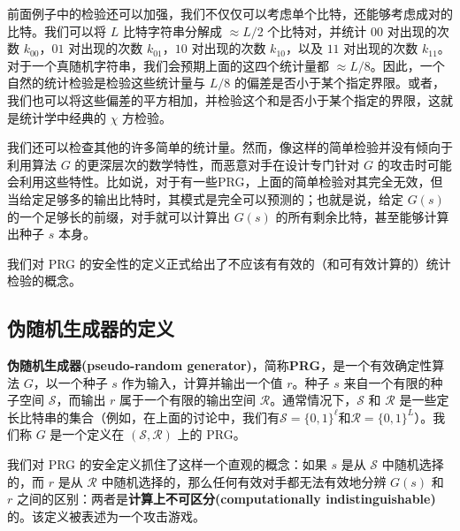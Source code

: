 前面例子中的检验还可以加强，我们不仅仅可以考虑单个比特，还能够考虑成对的比特。我们可以将 $L$ 比特字符串分解成 $\approx{L}/{2}$ 个比特对，并统计 $00$ 对出现的次数 $k_{00}$，$01$ 对出现的次数 $k_{01}$，$10$ 对出现的次数 $k_{10}$，以及 $11$ 对出现的次数 $k_{11}$。对于一个真随机字符串，我们会预期上面的这四个统计量都 $\approx{L}/{8}$。因此，一个自然的统计检验是检验这些统计量与 ${L}/{8}$ 的偏差是否小于某个指定界限。或者，我们也可以将这些偏差的平方相加，并检验这个和是否小于某个指定的界限，这就是统计学中经典的 $\chi$ 方检验。

我们还可以检查其他的许多简单的统计量。然而，像这样的简单检验并没有倾向于利用算法 $G$ 的更深层次的数学特性，而恶意对手在设计专门针对 $G$ 的攻击时可能会利用这些特性。比如说，对于有一些PRG，上面的简单检验对其完全无效，但当给定足够多的输出比特时，其模式是完全可以预测的；也就是说，给定 $G(s)$ 的一个足够长的前缀，对手就可以计算出 $G(s)$ 的所有剩余比特，甚至能够计算出种子 $s$ 本身。

我们对 PRG 的安全性的定义正式给出了不应该有有效的（和可有效计算的）统计检验的概念。

\subsection{伪随机生成器的定义}

\textbf{伪随机生成器(pseudo-random generator)}，简称\textbf{PRG}，是一个有效确定性算法 $G$，以一个种子 $s$ 作为输入，计算并输出一个值 $r$。种子 $s$ 来自一个有限的种子空间 $\mathcal{S}$，而输出 $r$ 属于一个有限的输出空间 $\mathcal{R}$。通常情况下，$\mathcal{S}$ 和 $\mathcal{R}$ 是一些定长比特串的集合（例如，在上面的讨论中，我们有$\mathcal{S}=\{0,1\}^\ell$和$\mathcal{R}=\{0,1\}^L$）。我们称 $G$ 是一个定义在 $(\mathcal{S},\mathcal{R})$ 上的 PRG。

我们对 PRG 的安全定义抓住了这样一个直观的概念：如果 $s$ 是从 $\mathcal{S}$ 中随机选择的，而 $r$ 是从 $\mathcal{R}$ 中随机选择的，那么任何有效对手都无法有效地分辨 $G(s)$ 和 $r$ 之间的区别：两者是\textbf{计算上不可区分(computationally indistinguishable)}的。该定义被表述为一个攻击游戏。

